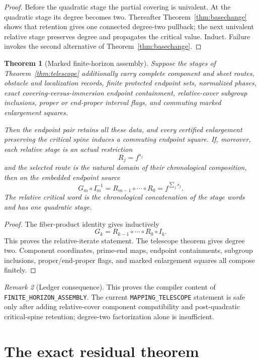 \documentclass[11pt]{article}
\newtheorem{theorem}{Theorem}[section]
\theoremstyle{definition}
\theoremstyle{remark}
\newtheorem{remark}[theorem]{Remark}
\begin{document}
\begin{proof}
Before the quadratic stage the partial covering is univalent.  At the quadratic stage its degree becomes two.  Thereafter Theorem~\ref{thm:basechange} shows that retention gives one connected degree-two pullback; the next univalent relative stage preserves degree and propagates the critical value.  Induct.  Failure invokes the second alternative of Theorem~\ref{thm:basechange}.
\end{proof}

\begin{theorem}[Marked finite-horizon assembly]\label{thm:marked}
Suppose the stages of Theorem~\ref{thm:telescope} additionally carry complete component and sheet routes, obstacle and localization records, finite protected endpoint sets, normalized phases, exact covering-versus-immersion endpoint containment, relative-cover subgroup inclusions, proper or end-proper interval flags, and commuting marked enlargement squares.

Then the endpoint pair retains all these data, and every certified enlargement preserving the critical spine induces a commuting endpoint square.  If, moreover, each relative stage is an actual restriction
\[
 R_j=f^{s_j}
\]
and the selected route is the natural domain of their chronological composition, then on the embedded endpoint source
\[
 G_m\circ I_m^{-1}
 =R_{m-1}\circ\cdots\circ R_0
 =f^{\sum_js_j}.
\]
The relative critical word is the chronological concatenation of the stage words and has one quadratic stage.
\end{theorem}

\begin{proof}
The fiber-product identity gives inductively
\[
 G_k=R_{k-1}\circ\cdots\circ R_0\circ I_k.
\]
This proves the relative-iterate statement.  The telescope theorem gives degree two.  Component coordinates, prime-end maps, endpoint containments, subgroup inclusions, proper/end-proper flags, and marked enlargement squares all compose finitely.
\end{proof}

\begin{remark}[Ledger consequence]
This proves the compiler content of \texttt{FINITE\_HORIZON\_ASSEMBLY}.  The current \texttt{MAPPING\_TELESCOPE} statement is safe only after adding relative-cover component compatibility and post-quadratic critical-spine retention; degree-two factorization alone is insufficient.
\end{remark}

\section{The exact residual theorem}
\end{document}
